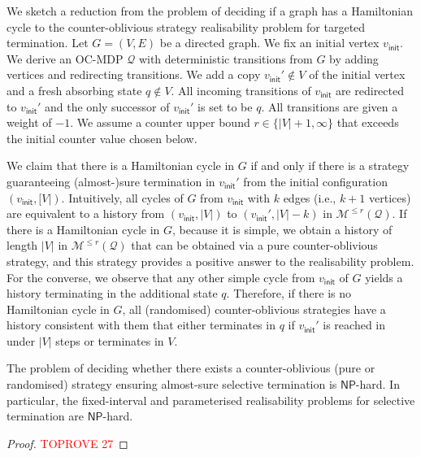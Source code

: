 \documentclass[a4paper,UKenglish,cleveref,autoref,thm-restate,colorlinks]{lipics-v2021}
\newcommand{\init}{\mathsf{init}}
\newcommand{\np}{\textsf{NP}}
\newcommand{\graph}{G}
\newcommand{\vertexSet}{V}
\newcommand{\vertex}{v}
\newcommand{\edgeSet}{E}
\newcommand{\mdp}{\mathcal{M}}
\newcommand{\ocmdp}{\mathcal{Q}}
\newcommand{\ocmdpFin}[2]{\mdp^{\leq #2}(#1)}
\newcommand{\ocState}{q}
\newcommand{\ocCount}{k}
\newcommand{\counterUB}{r}
\begin{document}
We sketch a reduction from the problem of deciding if a graph has a Hamiltonian cycle to the counter-oblivious strategy realisability problem for targeted termination.
Let $\graph = (\vertexSet, \edgeSet)$ be a directed graph.
We fix an initial vertex $\vertex_\init$.
We derive an OC-MDP $\ocmdp$ with deterministic transitions from $\graph$ by adding vertices and redirecting transitions.
We add a copy $\vertex_\init'\notin\vertexSet$ of the initial vertex and a fresh absorbing state $\ocState\notin\vertexSet$.
All incoming transitions of $\vertex_\init$ are redirected to $\vertex_\init'$ and the only successor of $\vertex_\init'$ is set to be $\ocState$.
All transitions are given a weight of $-1$.
We assume a counter upper bound $\counterUB\in\{|\vertexSet|+1, \infty\}$ that exceeds the initial counter value chosen below.

We claim that there is a Hamiltonian cycle in $\graph$ if and only if there is a strategy guaranteeing (almost-)sure termination in $\vertex_\init'$ from the initial configuration $(\vertex_\init, [\vertexSet|)$.
Intuitively, all cycles of $\graph$ from $\vertex_\init$ with $\ocCount$ edges (i.e., $\ocCount+1$ vertices) are equivalent to a history from $(\vertex_\init, |\vertexSet|)$ to $(\vertex_\init', |\vertexSet|-\ocCount)$ in $\ocmdpFin{\ocmdp}{\counterUB}$.
If there is a Hamiltonian cycle in $\graph$, because it is simple, we obtain a history of length $|\vertexSet|$ in $\ocmdpFin{\ocmdp}{\counterUB}$ that can be obtained via a pure counter-oblivious strategy, and this strategy provides a positive answer to the realisability problem.
For the converse, we observe that any other simple cycle from $\vertex_\init$ of $\graph$ yields a history terminating in the additional state $\ocState$.
Therefore, if there is no Hamiltonian cycle in $\graph$, all (randomised) counter-oblivious strategies have a history consistent with them that either terminates in $\ocState$ if $\vertex_\init'$ is reached in under $|\vertexSet|$ steps or terminates in $\vertexSet$.

\begin{theorem}\label{theorem:realisability:np-hardness}
  The problem of deciding whether there exists a counter-oblivious (pure or randomised) strategy ensuring almost-sure selective termination is $\np$-hard.
  In particular, the fixed-interval and parameterised realisability problems for selective termination are $\np$-hard.
\end{theorem}
\begin{proof}\textcolor{red}{TOPROVE 27}\end{proof}
\end{document}
